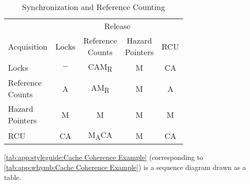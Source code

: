 \begin{table}[tb]
\renewcommand*{\arraystretch}{1.25}
\small
\centering
\begin{tabular}{lcccc}
	\toprule
	& \multicolumn{4}{c}{Release} \\
	\cmidrule(l){2-5}
	Acquisition	& Locks
				& \parbox[c]{.5in}{Reference\\Counts}
					& \parbox[c]{.5in}{Hazard\\Pointers}
						& RCU \\
	 \cmidrule(l){2-5}
	Locks		& $-$	& CAM\textsubscript{R}	& M	& CA  \\
	\parbox[c][6ex]{.6in}{Reference\\Counts}
			& A	& AM\textsubscript{R}    & M	& A   \\
	\parbox[c][6ex]{.6in}{Hazard\\Pointers}
			& M	& M	& M	& M   \\
	RCU		& CA	& M\textsubscript{A}CA	& M	& CA  \\
	\bottomrule
\end{tabular}

\vspace{5pt}\hfill
{}
\caption{Synchronization and Reference Counting}
\label{tab:app:styleguide:Synchronization and Reference Counting}
\end{table}

\cref{tab:app:styleguide:Cache Coherence Example}
(corresponding to
\cref{tab:app:whymb:Cache Coherence Example})
is a sequence diagram drawn as a table.

